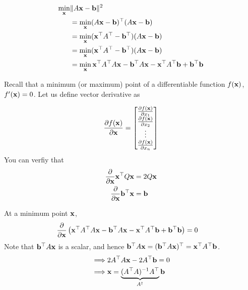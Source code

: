 \documentclass[twocolumn]{article}
\begin{document}
\begin{align}
  \min_{\mathbf{x}} &\|A\mathbf{x} - \mathbf{b}\|^2
  \\
              &= \min_{\mathbf{x}} (A\mathbf{x} - \mathbf{b})^\top (A\mathbf{x} - \mathbf{b})
  \\
              &= \min_{\mathbf{x}} (\mathbf{x}^\top A^\top - \mathbf{b}^\top) (A\mathbf{x} - \mathbf{b})
  \\
              &= \min_{\mathbf{x}} (\mathbf{x}^\top A^\top - \mathbf{b}^\top) (A\mathbf{x} - \mathbf{b})
  \\
              &= \min_{\mathbf{x}} \mathbf{x}^\top A^\top A\mathbf{x} - \mathbf{b}^\top A\mathbf{x} - \mathbf{x}^\top A^\top \mathbf{b} + \mathbf{b}^\top \mathbf{b}
\end{align}

Recall that a minimum (or maximum) point of a differentiable function $f(\mathbf{x})$,
$f'(\mathbf{x})  = 0$. Let us define vector derivative as

\begin{align}
  \frac{\partial f(\mathbf{x})}{\partial \mathbf{x}} = \begin{bmatrix}
    \frac{\partial f(\mathbf{x})}{\partial x_1}
    \\
    \frac{\partial f(\mathbf{x})}{\partial x_2}
    \\
    \vdots
    \\
    \frac{\partial f(\mathbf{x})}{\partial x_n}
  \end{bmatrix}
\end{align}
You can verfiy that
\begin{align}
  \frac{\partial }{\partial \mathbf{x}} \mathbf{x}^\top Q \mathbf{x} &= 2 Q\mathbf{x}
  \\
  \frac{\partial }{\partial \mathbf{x}} \mathbf{b}^\top \mathbf{x} &= \mathbf{b}
\end{align}

At a minimum point $\mathbf{x}$,
%
\begin{align}
  &\frac{\partial }{\partial \mathbf{x}} \left(\mathbf{x}^\top A^\top A\mathbf{x} - \mathbf{b}^\top A\mathbf{x} - \mathbf{x}^\top A^\top \mathbf{b} + \mathbf{b}^\top \mathbf{b}\right) = 0
\end{align}
%
Note that  $\mathbf{b}^\top A\mathbf{x}$ is a scalar, and hence $\mathbf{b}^\top A\mathbf{x} =
(\mathbf{b}^\top A\mathbf{x})^\top = \mathbf{x}^\top A^\top \mathbf{b}$.
%
\begin{align}
  \implies & 2A^\top A\mathbf{x} - 2 A^\top \mathbf{b} = 0
  \\
  \implies & \mathbf{x} = \underbrace{(A^\top A)^{-1} A^\top}_{A^\dagger} \mathbf{b}
\end{align}

\listoftheorems[ignoreall,show={defn}]
\end{document}
